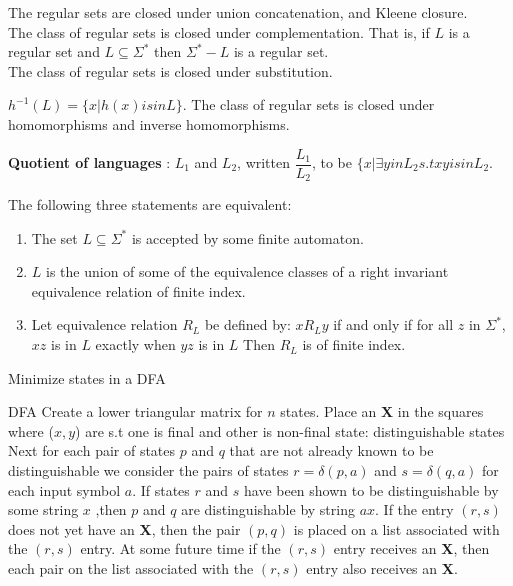 \documentclass[a4paper,oneside]{book}
\begin{document}
\begin{definition}
The regular sets are closed under union concatenation, and Kleene closure.\\
The class of regular sets is closed under complementation. That is, if $L$ is a regular set and $L \subseteq \Sigma^*$ then $\Sigma^* - L$ is a regular set.\\
The class of regular sets is closed under substitution.
\end{definition}
\begin{definition}[Homomorphism]
$h^{-1} (L) = \{ x|h(x) is in L\}.$ The class of regular sets is closed under homomorphisms and inverse homomorphisms.
\end{definition}
\begin{definition}
\textbf{Quotient of languages} : $L_1$ and $L_2$, written $\dfrac{L_1}{L_2}$, to be $\{ x | \exists y in L_2 s.t xy is in L_2$.
\end{definition}
\begin{definition}
The following three statements are equivalent:
\begin{enumerate}
\item The set $L \subseteq \Sigma^*$ is accepted by some finite automaton.
\item $L$ is the union of some of the equivalence classes of a right invariant equivalence relation of finite index.
\item Let equivalence relation $R_L$ be defined by: $xR_Ly$ if and only if for all $z$ in $\Sigma^*$, $xz$ is in $L$ exactly when $yz$ is in $L$ Then $R_L$ is of finite index.
\end{enumerate}
\end{definition}
\begin{algorithm}[H]
	\caption{Minimize states in a DFA}
	\label{minStateDFA}
	\begin{algorithmic}[1]
		\REQUIRE DFA
		\STATE Create a lower triangular matrix for $n$ states.
		\STATE Place an \textbf{X} in the squares where ($x, y$) are s.t one is final and other is non-final state: distinguishable states
		\STATE Next for each pair of states $p$ and $q$ that are not already known to be distinguishable we consider the pairs of states $r = \delta(p, a)$ and $s = \delta(q, a)$ for each input symbol $a$.
		\STATE If states $r$ and $s$ have been shown to be distinguishable by some string $x$ ,then $p$ and $q$ are distinguishable by string $ax$.
		\STATE If the entry $(r, s)$ does not yet have an \textbf{X}, then the pair $(p, q)$ is placed on a list associated with the $(r, s)$ entry. At some future time if the $(r, s)$ entry receives an \textbf{X}, then each pair on the list associated with the $(r, s)$ entry also receives an \textbf{X}.
	\end{algorithmic}
\end{algorithm}
\end{document}
